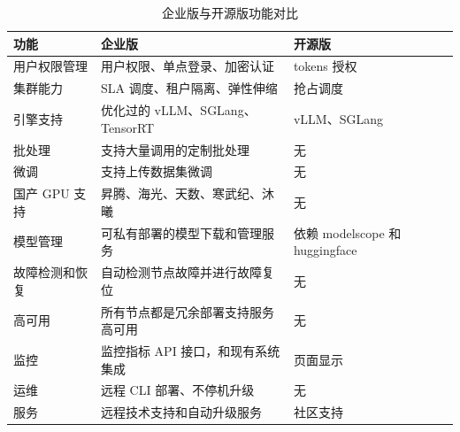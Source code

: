 \documentclass[12pt,UTF8]{ctexbook}
\begin{document}
\begin{table}[htbp]
    \centering
    \caption{企业版与开源版功能对比}
    \begin{tabular}{|p{3cm}|p{5cm}|p{5cm}|}
        \hline
        \textbf{功能} & \textbf{企业版} & \textbf{开源版} \\
        \hline
        用户权限管理 & 用户权限、单点登录、加密认证 & tokens 授权 \\
        \hline
        集群能力 & SLA 调度、租户隔离、弹性伸缩 & 抢占调度 \\
        \hline
        引擎支持 & 优化过的 vLLM、SGLang、TensorRT & vLLM、SGLang \\
        \hline
        批处理 & 支持大量调用的定制批处理 & 无 \\
        \hline
        微调 & 支持上传数据集微调 & 无 \\
        \hline
        国产 GPU 支持 & 昇腾、海光、天数、寒武纪、沐曦 & 无 \\
        \hline
        模型管理 & 可私有部署的模型下载和管理服务 & 依赖 modelscope 和 huggingface \\
        \hline
        故障检测和恢复 & 自动检测节点故障并进行故障复位 & 无 \\
        \hline
        高可用 & 所有节点都是冗余部署支持服务高可用 & 无 \\
        \hline
        监控 & 监控指标 API 接口，和现有系统集成 & 页面显示 \\
        \hline
        运维 & 远程 CLI 部署、不停机升级 & 无 \\
        \hline
        服务 & 远程技术支持和自动升级服务 & 社区支持 \\
        \hline
    \end{tabular}
\end{table}

\backmatter
\end{document}
